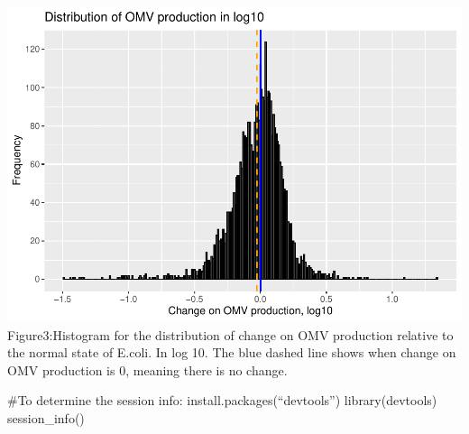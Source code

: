 \documentclass[
]{article}
\begin{document}
\includegraphics{OMV-analysis_files/figure-latex/figure3-1.pdf}
Figure3:Histogram for the distribution of change on OMV production
relative to the normal state of E.coli. In log 10. The blue dashed line
shows when change on OMV production is 0, meaning there is no change.

\#To determine the session info: install.packages(``devtools'')
library(devtools) session\_info()
\end{document}
